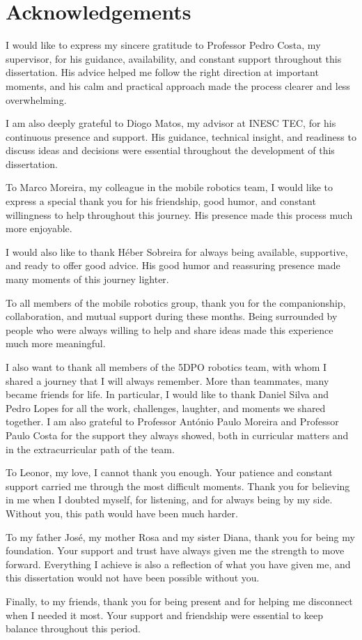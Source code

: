 \chapter*{Acknowledgements}
\hspace{\parindent}
I would like to express my sincere gratitude to Professor Pedro Costa, my supervisor, for his guidance, availability, and constant support throughout this dissertation. His advice helped me follow the right direction at important moments, and his calm and practical approach made the process clearer and less overwhelming.

I am also deeply grateful to Diogo Matos, my advisor at INESC TEC, for his continuous presence and support. His guidance, technical insight, and readiness to discuss ideas and decisions were essential throughout the development of this dissertation.

To Marco Moreira, my colleague in the mobile robotics team, I would like to express a special thank you for his friendship, good humor, and constant willingness to help throughout this journey. His presence made this process much more enjoyable.

I would also like to thank Héber Sobreira for always being available, supportive, and ready to offer good advice. His good humor and reassuring presence made many moments of this journey lighter.


To all members of the mobile robotics group, thank you for the companionship, collaboration, and mutual support during these months. Being surrounded by people who were always willing to help and share ideas made this experience much more meaningful.

I also want to thank all members of the 5DPO robotics team, with whom I shared a journey that I will always remember. More than teammates, many became friends for life. In particular, I would like to thank Daniel Silva and Pedro Lopes for all the work, challenges, laughter, and moments we shared together.
I am also grateful to Professor António Paulo Moreira and Professor Paulo Costa for the support they always showed, both in curricular matters and in the extracurricular path of the team.

To Leonor, my love, I cannot thank you enough. Your patience and constant support carried me through the most difficult moments. Thank you for believing in me when I doubted myself, for listening, and for always being by my side. Without you, this path would have been much harder.

To my father José, my mother Rosa and my sister Diana, thank you for being my foundation. Your support and trust have always given me the strength to move forward. Everything I achieve is also a reflection of what you have given me, and this dissertation would not have been possible without you.

Finally, to my friends, thank you for being present and for helping me disconnect when I needed it most. Your support and friendship were essential to keep balance throughout this period.

\vspace{10mm}
